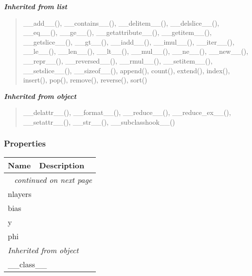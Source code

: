 \large{\textbf{\textit{Inherited from list}}}

\begin{quote}
\_\_add\_\_(), \_\_contains\_\_(), \_\_delitem\_\_(), \_\_delslice\_\_(), \_\_eq\_\_(), \_\_ge\_\_(), \_\_getattribute\_\_(), \_\_getitem\_\_(), \_\_getslice\_\_(), \_\_gt\_\_(), \_\_iadd\_\_(), \_\_imul\_\_(), \_\_iter\_\_(), \_\_le\_\_(), \_\_len\_\_(), \_\_lt\_\_(), \_\_mul\_\_(), \_\_ne\_\_(), \_\_new\_\_(), \_\_repr\_\_(), \_\_reversed\_\_(), \_\_rmul\_\_(), \_\_setitem\_\_(), \_\_setslice\_\_(), \_\_sizeof\_\_(), append(), count(), extend(), index(), insert(), pop(), remove(), reverse(), sort()
\end{quote}

\large{\textbf{\textit{Inherited from object}}}

\begin{quote}
\_\_delattr\_\_(), \_\_format\_\_(), \_\_reduce\_\_(), \_\_reduce\_ex\_\_(), \_\_setattr\_\_(), \_\_str\_\_(), \_\_subclasshook\_\_()
\end{quote}


  \subsubsection{Properties}

    \vspace{-1cm}
\hspace{\varindent}\begin{longtable}{|p{\varnamewidth}|p{\vardescrwidth}|l}
\cline{1-2}
\cline{1-2} \centering \textbf{Name} & \centering \textbf{Description}& \\
\cline{1-2}
\endhead\cline{1-2}\multicolumn{3}{r}{\small\textit{continued on next page}}\\\endfoot\cline{1-2}
\endlastfoot\raggedright n\-l\-a\-y\-e\-r\-s\- & &\\
\cline{1-2}
\raggedright b\-i\-a\-s\- & &\\
\cline{1-2}
\raggedright y\- & &\\
\cline{1-2}
\raggedright p\-h\-i\- & &\\
\cline{1-2}
\multicolumn{2}{|l|}{\textit{Inherited from object}}\\
\multicolumn{2}{|p{\varwidth}|}{\raggedright \_\_class\_\_}\\
\cline{1-2}
\end{longtable}


